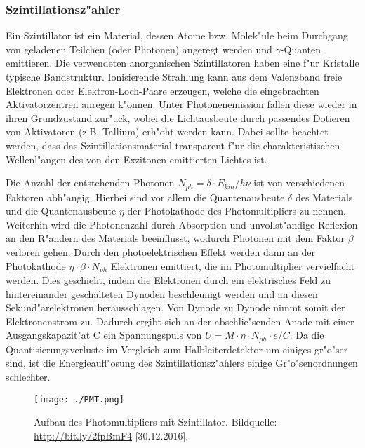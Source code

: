 \documentclass[12pt]{article}
\begin{document}
\subsubsection{Szintillationsz"ahler}
Ein Szintillator ist ein Material, dessen Atome bzw. Molek"ule beim Durchgang von geladenen Teilchen (oder Photonen) angeregt werden und $\gamma$-Quanten emittieren. Die verwendeten anorganischen Szintillatoren haben eine f"ur Kristalle typische Bandstruktur. Ionisierende Strahlung kann aus dem Valenzband freie Elektronen oder Elektron-Loch-Paare erzeugen, welche die eingebrachten Aktivatorzentren anregen k"onnen. Unter Photonenemission fallen diese wieder in ihren Grundzustand zur"uck, wobei die Lichtausbeute durch passendes Dotieren von Aktivatoren (z.B. Tallium) erh"oht werden kann. Dabei sollte beachtet werden, dass das Szintillationsmaterial transparent f"ur die charakteristischen Wellenl"angen des von den Exzitonen emittierten Lichtes ist.
\par 
Die Anzahl der entstehenden Photonen $N_{ph}=\delta \cdot E_{kin}/h\nu$ ist von verschiedenen Faktoren abh"angig. Hierbei sind vor allem die Quantenausbeute $\delta$ des Materials und die Quantenausbeute $\eta$ der Photokathode des Photomultipliers zu nennen. Weiterhin wird die Photonenzahl durch Absorption und unvollst"andige Reflexion an den R"andern des Materials beeinflusst, wodurch Photonen mit dem Faktor $\beta$ verloren gehen. Durch den photoelektrischen Effekt werden dann an der Photokathode $\eta \cdot \beta \cdot N_{ph}$ Elektronen emittiert, die im Photomultiplier vervielfacht werden. Dies geschieht, indem die Elektronen durch ein elektrisches Feld zu hintereinander geschalteten Dynoden beschleunigt werden und an diesen Sekund"arelektronen herausschlagen. Von Dynode zu Dynode nimmt somit der Elektronenstrom zu. Dadurch ergibt sich an der abschlie"senden Anode mit einer Ausgangskapazit"at C ein Spannungspuls von $U=M\cdot \eta \cdot N_{ph} \cdot e/C$. Da die Quantisierungsverluste im Vergleich zum Halbleiterdetektor um einiges gr"o"ser sind, ist die Energieaufl"osung des Szintillationsz"ahlers einige Gr"o"senordnungen schlechter. 
\begin{center}
	\centering
	\begin{figure}[h]
		\centering
		\texttt{[image: ./PMT.png]}
		\caption[Szintillator]{Aufbau des Photomultipliers mit Szintillator. \newline Bildquelle: \url{http://bit.ly/2fpBmF4} [30.12.2016].}
		\label{fig:PMT}
	\end{figure}
\end{center}
\par 
\end{document}
